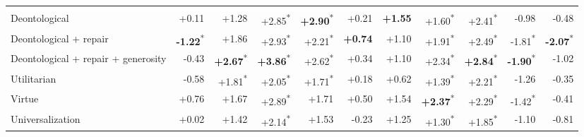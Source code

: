 \begin{table}[t]
\begin{tabular}{lrrrrrrrrrr}
\addlinespace
\multicolumn{11}{l}{\emph{Chicken}} \\
Deontological & +0.11 & +1.28 & +2.85\textsuperscript{*} & \textbf{+2.90}\textsuperscript{*} & +0.21 & \textbf{+1.55} & +1.60\textsuperscript{*} & +2.41\textsuperscript{*} & -0.98 & -0.48 \\
Deontological + repair & \textbf{-1.22}\textsuperscript{*} & +1.86 & +2.93\textsuperscript{*} & +2.21\textsuperscript{*} & \textbf{+0.74} & +1.10 & +1.91\textsuperscript{*} & +2.49\textsuperscript{*} & -1.81\textsuperscript{*} & \textbf{-2.07}\textsuperscript{*} \\
Deontological + repair + generosity & -0.43 & \textbf{+2.67}\textsuperscript{*} & \textbf{+3.86}\textsuperscript{*} & +2.62\textsuperscript{*} & +0.34 & +1.10 & +2.34\textsuperscript{*} & \textbf{+2.84}\textsuperscript{*} & \textbf{-1.90}\textsuperscript{*} & -1.02 \\
Utilitarian & -0.58 & +1.81\textsuperscript{*} & +2.05\textsuperscript{*} & +1.71\textsuperscript{*} & +0.18 & +0.62 & +1.39\textsuperscript{*} & +2.21\textsuperscript{*} & -1.26 & -0.35 \\
Virtue & +0.76 & +1.67 & +2.89\textsuperscript{*} & +1.71 & +0.50 & +1.54 & \textbf{+2.37}\textsuperscript{*} & +2.29\textsuperscript{*} & -1.42\textsuperscript{*} & -0.41 \\
Universalization & +0.02 & +1.42 & +2.14\textsuperscript{*} & +1.53 & -0.23 & +1.25 & +1.30\textsuperscript{*} & +1.85\textsuperscript{*} & -1.10 & -0.81 \\
\bottomrule
\end{tabular}
\end{table}

